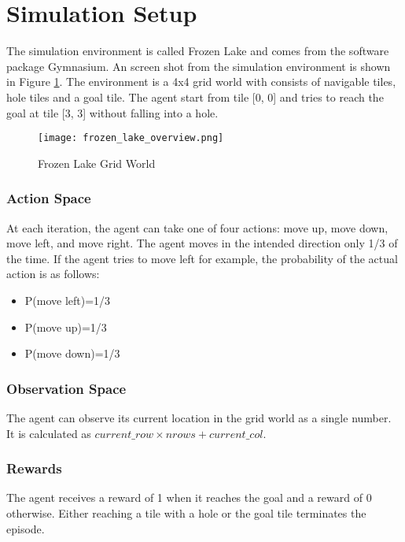 \documentclass[conference]{IEEEtran}
\begin{document}
\section{Simulation Setup}

The simulation environment is called Frozen Lake and comes from the software package Gymnasium\cite{towersGymnasium2024}. An screen shot from the simulation environment is shown in Figure \ref{fig:frozen_lake_overview}. The environment is a 4x4 grid world with consists of navigable tiles, hole tiles and a goal tile. The agent start from tile [0, 0] and tries to reach the goal at tile [3, 3] without falling into a hole.

\begin{figure}
    \centering
    \texttt{[image: frozen\_lake\_overview.png]}
    \caption{Frozen Lake Grid World}
    \label{fig:frozen_lake_overview}
\end{figure}

\subsubsection{Action Space}

At each iteration, the agent can take one of four actions: move up, move down, move left, and move right. The agent moves in the intended direction only 1/3 of the time. If the agent tries to move left for example, the probability of the actual action is as follows:

\begin{itemize}
    \item P(move left)=1/3
    \item P(move up)=1/3
    \item P(move down)=1/3
\end{itemize}

\subsubsection{Observation Space}

The agent can observe its current location in the grid world as a single number. It is calculated as \(current\_row \times nrows + current\_col\).

\subsubsection{Rewards}

The agent receives a reward of 1 when it reaches the goal and a reward of 0 otherwise. Either reaching a tile with a hole or the goal tile terminates the episode.
\end{document}
